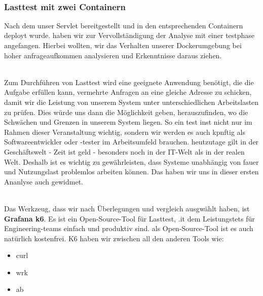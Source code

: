\\

\subsubsection{Lasttest mit zwei Containern}

Nach dem unser Servlet bereitgestellt und in den entsprechenden Containern deployt wurde. haben wir zur Vervollständigung der Analyse mit einer testphase angefangen. Hierbei wollten, wir das Verhalten unserer Dockerumgebung bei hoher anfrageaufkommen analysieren und Erkenntnisse daraus ziehen.

\\

Zum Durchführen von Lasttest wird eine geeignete Anwendung benötigt, die die Aufgabe erfüllen kann, vermehrte Anfragen an eine gleiche Adresse zu schicken, damit wir die Leistung von unserem System unter unterschiedlichen Arbeitslasten zu prüfen. Dies würde uns dann die Möglichkeit geben, herauszufinden, wo die Schwächen und Grenzen in unserem System liegen. So ein test inst nicht nur im Rahmen dieser Veranstaltung wichtig, sondern wir werden es auch kpnftig als Softwareentwickler oder -tester im Arbeitsumfeld brauchen. heutzutage gilt in der Geschäftswelt - Zeit ist geld - besonders noch in der IT-Welt als in der realen Welt. Deshalb ist es wichtig zu gewährleisten, dass Systeme unabhängig von fauer und Nutzungslast problemlos arbeiten können. Das haben wir uns in dieser ersten Ananlyse auch gewidmet.

\\

Das Werkzeug, dass wir nach Überlegungen und vergleich ausgwählt haben, ist \textbf{Grafana k6}. Es ist ein Open-Source-Tool für Lasttest, .it dem Leistungstets für Engineering-teams einfach und produktiv sind. als Open-Source-Tool ist es auch natürlich kostenfrei. K6 haben wir zwischen all den anderen Tools wie:

\begin{itemize}
    \item curl
    \item wrk
    \item ab
\end{itemize}

